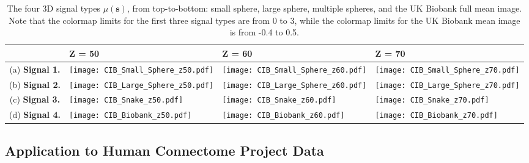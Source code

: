 \begin{table}[htbp]
\hspace*{-0.5cm}
\begin{adjustbox}{center}
\centering
    \begin{tabular}{cm{50mm}m{50mm}m{50mm}}
       \toprule
         & \hspace{15.5mm} Z = 50 & \hspace{15.5mm} Z = 60 & \hspace{15.5mm} Z = 70 \\
        \midrule
        (a) \textbf{Signal 1.} & \texttt{[image: CIB\_Small\_Sphere\_z50.pdf]} & \texttt{[image: CIB\_Small\_Sphere\_z60.pdf]} & \texttt{[image: CIB\_Small\_Sphere\_z70.pdf]} \\
        (b) \textbf{Signal 2.} & \texttt{[image: CIB\_Large\_Sphere\_z50.pdf]} & \texttt{[image: CIB\_Large\_Sphere\_z60.pdf]} & \texttt{[image: CIB\_Large\_Sphere\_z70.pdf]} \\
        (c) \textbf{Signal 3.} & \texttt{[image: CIB\_Snake\_z50.pdf]} & \texttt{[image: CIB\_Snake\_z60.pdf]} & \texttt{[image: CIB\_Snake\_z70.pdf]} \\
        (d) \textbf{Signal 4.} & \texttt{[image: CIB\_Biobank\_z50.pdf]} & \texttt{[image: CIB\_Biobank\_z60.pdf]} & \texttt{[image: CIB\_Biobank\_z70.pdf]} \\
        \bottomrule
    \end{tabular}
\end{adjustbox}
    \caption{The four 3D signal types $\mu(\bm{s})$, from top-to-bottom: small sphere, large sphere, multiple spheres, and the UK Biobank full mean image. Note that the colormap limits for the first three signal types are from 0 to 3, while the colormap limits for the UK Biobank mean image is from -0.4 to 0.5.}
    \label{tbl:3D_figures}
\end{table}

\subsection{Application to Human Connectome Project Data}
\label{sec:HCP_methods}


